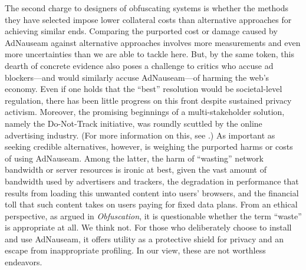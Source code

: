 \documentclass[conference]{IEEEtran}
\begin{document}
The second charge to designers of obfuscating systems is whether the methods they have selected impose lower collateral costs than alternative approaches for achieving similar ends. Comparing the purported cost or damage caused by AdNauseam against alternative approaches involves more measurements and even more uncertainties than we are able to tackle here. But, by the same token, this dearth of concrete evidence also poses a challenge to critics who accuse ad blockers---and would similarly accuse AdNauseam---of harming the web's economy. Even if one holds that the “best” resolution would be societal-level regulation, there has been little progress on this front despite sustained privacy activism. Moreover, the promising beginnings of a multi-stakeholder solution, namely the Do-Not-Track initiative, was roundly scuttled by the online advertising industry. (For more information on this, see \cite{Brunton}.)
As important as seeking credible alternatives, however, is weighing the purported harms or costs of using AdNauseam. Among the latter, the harm of “wasting” network bandwidth or server resources is ironic at best, given the vast amount of bandwidth used by advertisers and trackers, the degradation in performance that results from loading this unwanted content into users' browsers, and the financial toll that such content takes on users paying for fixed data plans. From an ethical perspective, as argued in \emph{Obfuscation}, it is questionable whether the term “waste” is appropriate at all. We think not. For those who deliberately choose to install and use AdNauseam, it offers utility as a protective shield for privacy and an escape from inappropriate profiling. In our view, these are not worthless endeavors.
\end{document}
